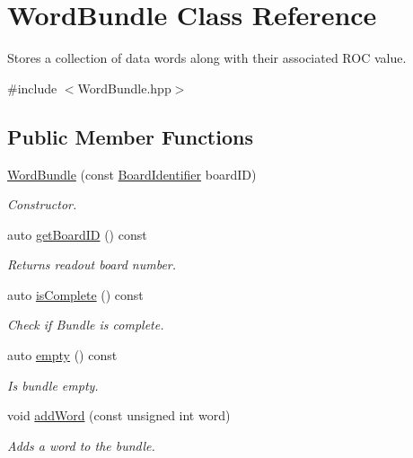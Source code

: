 \hypertarget{class_word_bundle}{}\section{Word\+Bundle Class Reference}
\label{class_word_bundle}


Stores a collection of data words along with their associated R\+OC value.  




{\ttfamily \#include $<$Word\+Bundle.\+hpp$>$}

\subsection*{Public Member Functions}
\begin{DoxyCompactItemize}
\item 
\hyperlink{class_word_bundle_ad097d49b23d5063e1be3ebc05022465b}{Word\+Bundle} (const \hyperlink{class_board_identifier}{Board\+Identifier} board\+ID)
\begin{DoxyCompactList}\small\item\em Constructor. \end{DoxyCompactList}\item 
auto \hyperlink{class_word_bundle_afa38c6a44582d1113b9d492bb72dc9ef}{get\+Board\+ID} () const
\begin{DoxyCompactList}\small\item\em Returns readout board number. \end{DoxyCompactList}\item 
auto \hyperlink{class_word_bundle_a3afd16d04f92eec06e08a6ec59028ae9}{is\+Complete} () const
\begin{DoxyCompactList}\small\item\em Check if Bundle is complete. \end{DoxyCompactList}\item 
auto \hyperlink{class_word_bundle_ab46858414d852c8d4079c4f611f4c96c}{empty} () const
\begin{DoxyCompactList}\small\item\em Is bundle empty. \end{DoxyCompactList}\item 
void \hyperlink{class_word_bundle_a167d2b6b4f504e4347191a8e5bb47e5e}{add\+Word} (const unsigned int word)
\begin{DoxyCompactList}\small\item\em Adds a word to the bundle. \end{DoxyCompactList}\item 

\end{DoxyCompactItemize}

